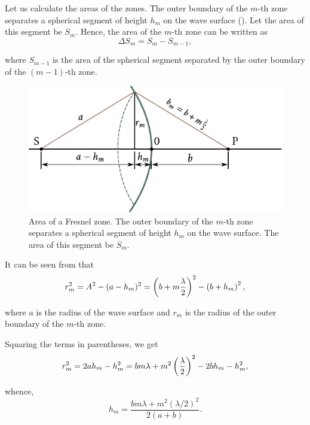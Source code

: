 Let us calculate the areas of the zones.
The outer boundary of the $m$-th zone separates a spherical segment of height $h_m$ on the wave surface ().
Let the area of this segment be $S_m$.
Hence, the area of the $m$-th zone can be written as
\begin{equation*}
    \Delta{S_m} = S_m - S_{m-1},
\end{equation*}

\noindent
where $S_{m-1}$ is the area of the spherical segment separated by the outer boundary of the $(m-1)$-th zone.

\begin{figure}[t]
	\begin{center}
		\includegraphics[scale=1]{figures/ch_18/fig_18_5.pdf}
        \caption[]{Area of a Fresnel zone. The outer boundary of the $m$-th zone separates a spherical segment of height $h_m$ on the wave surface. The area of this segment be $S_m$.}
		\label{fig:18_5}
	\end{center}
	\vspace{-0.8cm}
\end{figure}

It can be seen from  that
\begin{equation*}
    r_m^2 = A^2 - (a - h_m)^2 = \left(b + m\frac{\lambda}{2}\right)^2 - \left(b + h_m\right)^2,
\end{equation*}

\noindent
where $a$ is the radius of the wave surface and $r_m$ is the radius of the outer boundary of the $m$-th zone.

Squaring the terms in parentheses, we get
\begin{equation}\label{eq:18_5}
    r_m^2 = 2ah_m - h_m^2 = bm\lambda + m^2\left(\frac{\lambda}{2}\right)^2 - 2bh_m - h_m^2,
\end{equation}

\noindent
whence,
\begin{equation}\label{eq:18_6}
    h_m = \frac{bm\lambda + m^2 (\lambda/2)^2}{2(a+b)}.
\end{equation}

